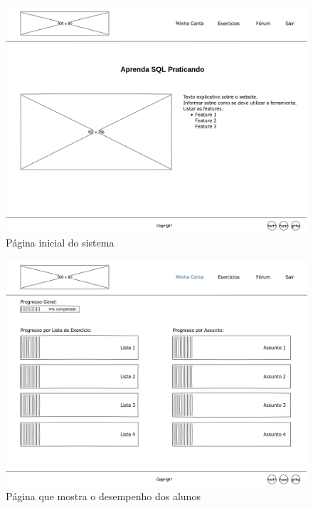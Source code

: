 \documentclass[graduacao,brazil]{ThesisPUC}
\begin{document}
\begin{figure}[H]
    \centering
    \includegraphics[width=\linewidth]{Imagens/WelcomePage.png}
    \caption{P\'{a}gina inicial do sistema}
\end{figure}

\begin{figure}[H]
    \centering
    \includegraphics[width=\linewidth]{Imagens/BoardPage.png}
    \caption{P\'{a}gina que mostra o desempenho dos alunos}
\end{figure}
\end{document}
